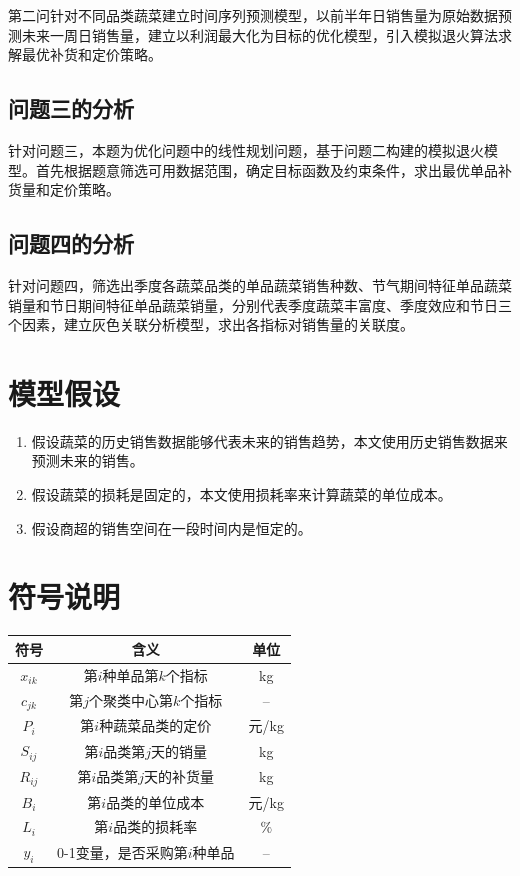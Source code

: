 \documentclass[a4paper,12pt]{article}
\begin{document}
	第二问针对不同品类蔬菜建立时间序列预测模型，以前半年日销售量为原始数据预测未来一周日销售量，建立以利润最大化为目标的优化模型，引入模拟退火算法求解最优补货和定价策略。
	
	\subsection{问题三的分析}
	
	针对问题三，本题为优化问题中的线性规划问题，基于问题二构建的模拟退火模型。首先根据题意筛选可用数据范围，确定目标函数及约束条件，求出最优单品补货量和定价策略。
	
	\subsection{问题四的分析}
	
	针对问题四，筛选出季度各蔬菜品类的单品蔬菜销售种数、节气期间特征单品蔬菜销量和节日期间特征单品蔬菜销量，分别代表季度蔬菜丰富度、季度效应和节日三个因素，建立灰色关联分析模型，求出各指标对销售量的关联度。
	
	\newpage
	
	\section{模型假设}
	
	\begin{enumerate}
		\item 假设蔬菜的历史销售数据能够代表未来的销售趋势，本文使用历史销售数据来预测未来的销售。
		\item 假设蔬菜的损耗是固定的，本文使用损耗率来计算蔬菜的单位成本。
		\item 假设商超的销售空间在一段时间内是恒定的。
	\end{enumerate}
	
	\newpage
	
	\section{符号说明}
	
	\begin{table}[H]
		\centering
		\begin{tabular}{c|c|c}
			\hline
			\textbf{符号} & \textbf{含义} & \textbf{单位} \\
			\hline
			$x_{ik}$ & 第$i$种单品第$k$个指标 & kg \\
			$c_{jk}$ & 第$j$个聚类中心第$k$个指标 & -- \\
			$P_i$ & 第$i$种蔬菜品类的定价 & 元/kg \\
			$S_{ij}$ & 第$i$品类第$j$天的销量 & kg \\
			$R_{ij}$ & 第$i$品类第$j$天的补货量 & kg \\
			$B_i$ & 第$i$品类的单位成本 & 元/kg \\
			$L_i$ & 第$i$品类的损耗率 & $\%$ \\
			$y_i$ & 0-1变量，是否采购第$i$种单品 & -- \\
			\hline
		\end{tabular}
	\end{table}
	
\end{document}
